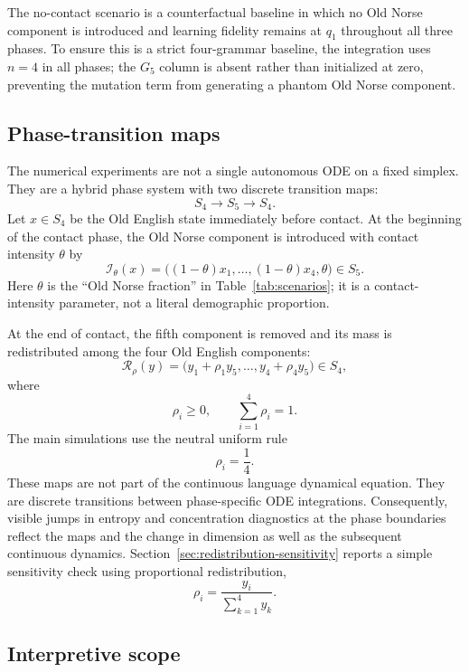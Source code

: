 \documentclass[11pt]{article}
\begin{document}
The no-contact scenario is a counterfactual baseline in which no Old Norse component is introduced and learning fidelity remains at $q_1$ throughout all three phases. To ensure this is a strict four-grammar baseline, the integration uses $n=4$ in all phases; the $G_5$ column is absent rather than initialized at zero, preventing the mutation term from generating a phantom Old Norse component.

\subsection{Phase-transition maps}

The numerical experiments are not a single autonomous ODE on a fixed simplex. They are a hybrid phase system with two discrete transition maps:
\[
S_4 \longrightarrow S_5 \longrightarrow S_4.
\]
Let $x\in S_4$ be the Old English state immediately before contact. At the beginning of the contact phase, the Old Norse component is introduced with contact intensity $\theta$ by
\begin{equation}
\mathcal I_\theta(x)
=
\bigl((1-\theta)x_1,\ldots,(1-\theta)x_4,\theta\bigr)
\in S_5.
\label{eq:introduction-map}
\end{equation}
Here $\theta$ is the ``Old Norse fraction'' in Table~\ref{tab:scenarios}; it is a contact-intensity parameter, not a literal demographic proportion.

At the end of contact, the fifth component is removed and its mass is redistributed among the four Old English components:
\begin{equation}
\mathcal R_\rho(y)
=
\bigl(y_1+\rho_1y_5,\ldots,y_4+\rho_4y_5\bigr)
\in S_4,
\label{eq:redistribution-map}
\end{equation}
where
\[
\rho_i\ge 0,\qquad \sum_{i=1}^4 \rho_i=1.
\]
The main simulations use the neutral uniform rule
\[
\rho_i=\frac{1}{4}.
\]
These maps are not part of the continuous language dynamical equation. They are discrete transitions between phase-specific ODE integrations. Consequently, visible jumps in entropy and concentration diagnostics at the phase boundaries reflect the maps and the change in dimension as well as the subsequent continuous dynamics. Section~\ref{sec:redistribution-sensitivity} reports a simple sensitivity check using proportional redistribution,
\[
\rho_i=\frac{y_i}{\sum_{k=1}^4 y_k}.
\]

\subsection{Interpretive scope}
\end{document}
